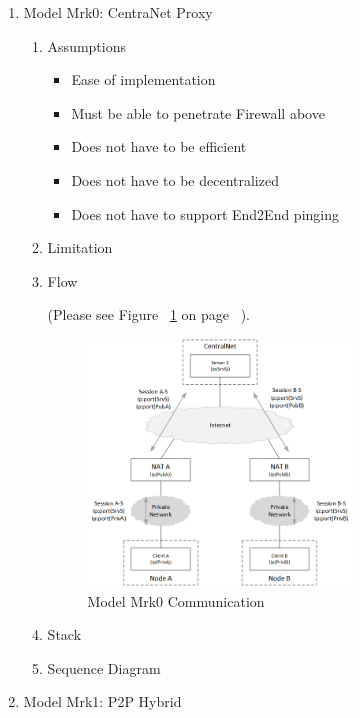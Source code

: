 \begin{enumerate}

\item Model Mrk0: CentraNet Proxy

\begin{enumerate}

\item Assumptions

\begin{itemize}

\item Ease of implementation
\item Must be able to penetrate Firewall above
\item Does not have to be efficient
\item Does not have to be decentralized
\item Does not have to support End2End pinging

\end{itemize}

\item Limitation

\item Flow

(Please see Figure ~\ref{fig:MM0C} on page ~\pageref{fig:MM0C}).

\begin{figure}[htbp]
    \centering
    \includegraphics[width=7cm,angle=0]{./diag/Issue/NATRelaying-Mk0-Issue.png}
	\caption{Model Mrk0 Communication}
    \label{fig:MM0C}
\end{figure}

\item Stack

\item Sequence Diagram

\end{enumerate}

\item Model Mrk1: P2P Hybrid


\end{enumerate}
